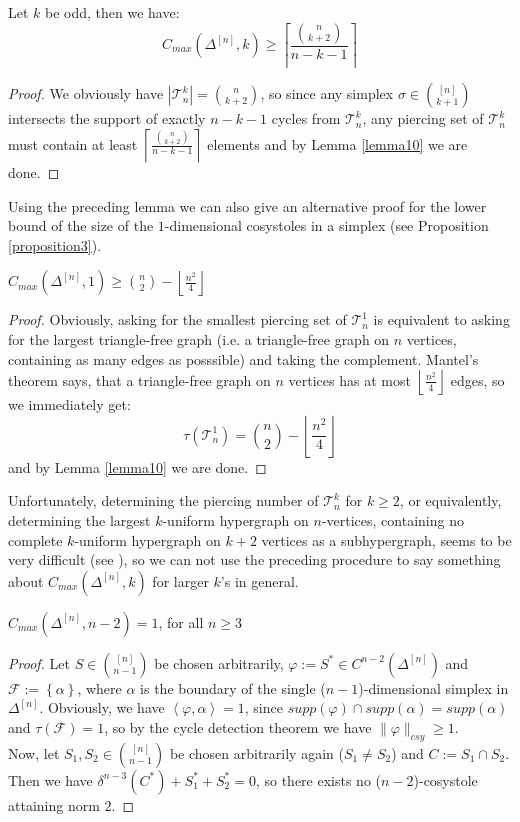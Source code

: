 \begin{prop}\label{proposition11}
Let \(k\) be odd, then we have:
\[
C_{max}(\Delta^{[n]},k)\geq \left\lceil\frac{\binom{n}{k+2}}{n-k-1}\right\rceil
\]
\begin{proof}
We obviously have \(|\mathcal{T}_n^k|=\binom{n}{k+2}\), so since any simplex \(\sigma\in\binom{[n]}{k+1}\) intersects the support of exactly \(n-k-1\) cycles from \(\mathcal{T}_n^k\), any piercing set of \(\mathcal{T}_n^k\) must contain at least \(\left\lceil\frac{\binom{n}{k+2}}{n-k-1}\right\rceil\) elements and by Lemma \ref{lemma10} we are done.
\end{proof}
\end{prop}

Using the preceding lemma we can also give an alternative proof for the lower bound of the size of the \(1\)-dimensional cosystoles in a simplex (see Proposition \ref{proposition3}).

\begin{thm}\label{theorem10}
\(C_{max}(\Delta^{[n]},1)\geq\binom{n}{2}-\left\lfloor\frac{n^2}{4}\right\rfloor\)
\begin{proof}
Obviously, asking for the smallest piercing set of \(\mathcal{T}_n^1\) is equivalent to asking for the largest triangle-free graph (i.e. a triangle-free graph on \(n\) vertices, containing as many edges as posssible) and taking the complement. Mantel's theorem says, that a triangle-free graph on \(n\) vertices has at most \(\left\lfloor\frac{n^2}{4}\right\rfloor\) edges, so we immediately get:
\[
\tau(\mathcal{T}_n^1)=\binom{n}{2}-\left\lfloor\frac{n^2}{4}\right\rfloor
\]
and by Lemma \ref{lemma10} we are done.
\end{proof}
\end{thm}

Unfortunately, determining the piercing number of \(\mathcal{T}_n^k\) for \(k\geq 2\), or equivalently, determining the largest \(k\)-uniform hypergraph on \(n\)-vertices, containing no complete \(k\)-uniform hypergraph on \(k+2\) vertices as a subhypergraph, seems to be very difficult (see \cite{7}), so we can not use the preceding procedure to say something about \(C_{max}(\Delta^{[n]},k)\) for larger \(k\)'s in general.

\begin{thm}\label{theorem7}
\(C_{max}(\Delta^{[n]},n-2)=1\), for all \(n\geq 3\)
\begin{proof}
Let \(S\in\binom{[n]}{n-1}\) be chosen arbitrarily, \(\varphi:=S^*\in C^{n-2}(\Delta^{[n]})\) and\\
\(\mathcal{F}:=\left\{\alpha\right\}\), where \(\alpha\) is the boundary of the single (\(n-1\))-dimensional simplex in \(\Delta^{[n]}\). Obviously, we have \(\left\langle\varphi,\alpha\right\rangle=1\), since \(supp(\varphi)\cap supp(\alpha)=supp(\alpha)\) and \(\tau(\mathcal{F})=1\), so by the cycle detection theorem we have \(\|\varphi\|_{csy}\geq 1\).\\
Now, let \(S_1,S_2\in\binom{[n]}{n-1}\) be chosen arbitrarily again (\(S_1\neq S_2\)) and \(C:=S_1\cap S_2\). Then we have \(\delta^{n-3}(C^*)+S_1^*+S_2^*=0\), so there exists no (\(n-2\))-cosystole attaining norm \(2\).
\end{proof}
\end{thm}

